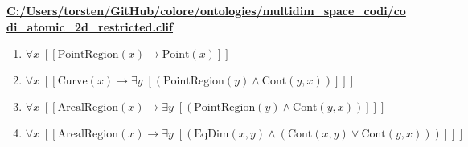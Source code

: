 \documentclass{article}
\begin{document}
\textbf{\url{C:/Users/torsten/GitHub/colore/ontologies/multidim\_space\_codi/codi\_atomic\_2d\_restricted.clif}}

\begin{enumerate}
\item $\forall x\;  \left[ \left[ \textrm{PointRegion}(x) \rightarrow \textrm{Point}(x) \right] \right]$
\item $\forall x\;  \left[ \left[ \textrm{Curve}(x) \rightarrow \exists y\;  \left[ \left(\textrm{PointRegion}(y) \land \textrm{Cont}(y,x)\right) \right] \right] \right]$
\item $\forall x\;  \left[ \left[ \textrm{ArealRegion}(x) \rightarrow \exists y\;  \left[ \left(\textrm{PointRegion}(y) \land \textrm{Cont}(y,x)\right) \right] \right] \right]$
\item $\forall x\;  \left[ \left[ \textrm{ArealRegion}(x) \rightarrow \exists y\;  \left[ \left(\textrm{EqDim}(x,y) \land \left(\textrm{Cont}(x,y) \lor \textrm{Cont}(y,x)\right)\right) \right] \right] \right]$
\end{enumerate}
\end{document}
